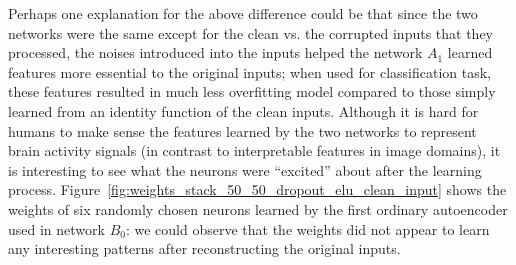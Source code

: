 \documentclass[12pt]{article}
\begin{document}
Perhaps one explanation for the above difference could be that since the two networks were the same except for the clean vs. the corrupted inputs that they processed, the noises introduced into the inputs helped the network $A_1$ learned features more essential to the original inputs; when used for classification task, these features resulted in much less overfitting model compared to those simply learned from an identity function of the clean inputs. Although it is hard for humans to make sense the features learned by the two networks to represent brain activity signals (in contrast to interpretable features in image domains), it is interesting to see what the neurons were ``excited'' about after the learning process. Figure~\ref{fig:weights_stack_50_50_dropout_elu_clean_input} shows the weights of six randomly chosen neurons learned by the first ordinary autoencoder used in network $B_0$: we could observe that the weights did not appear to learn any interesting patterns after reconstructing the original inputs.
\end{document}
